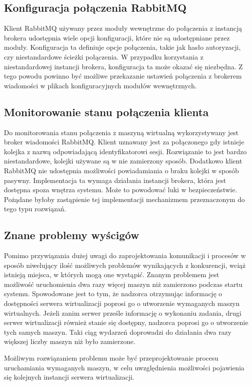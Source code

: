 \documentclass[../podsumowanie.tex]{subfiles}
\begin{document}
\subsection{Konfiguracja połączenia RabbitMQ}

Klient RabbitMQ używany przez moduły wewnętrzne do połączenia z instancją brokera udostępnia wiele opcji konfiguracji, które nie są udostępniane przez moduły. Konfiguracja ta definiuje opcje połączenia, takie jak hasło autoryzacji, czy niestandardowe ścieżki połączenia. W przypadku korzystania z niestandardowej instancji brokera, konfiguracja ta może okazać się niezbędna. Z tego powodu powinno być możliwe przekazanie ustawień połączenia z brokerem wiadomości w plikach konfiguracyjnych modułów wewnętrznych.

\subsection{Monitorowanie stanu połączenia klienta}

Do monitorowania stanu połączenia z maszyną wirtualną wykorzystywany jest broker wiadomości RabbitMQ. Klient uznawany jest za połączonego gdy istnieje kolejka z nazwą odpowiadającą identyfikatorowi sesji. Rozwiązanie to jest bardzo niestandardowe, kolejki używane są w nie zamierzony sposób. Dodatkowo klient RabbitMQ nie udostępnia możliwości powiadamiania o braku kolejki w sposób pasywny. Implementacja ta wymaga działania instancji brokera, która jest dostępna spoza wnętrza systemu. Może to powodować luki w bezpieczeństwie. Pożądane byłoby zastąpienie tej implementacji mechanizmem przeznaczonym do tego typu rozwiązań.

\subsection{Znane problemy wyścigów}

Pomimo przywiązania dużej uwagi do zaprojektowania komunikacji i procesów w sposób niwelujący ilość możliwych problemów wynikających z konkurencji, wciąż istnieją miejsca, w których mogą one wystąpić. Znanym problemem jest możliwość uruchomienia dwa razy więcej maszyn niż zamierzono podczas startu systemu. Spowodowane jest to tym, że nadzorca otrzymując informację o dostępności serwera wirtualizacji poprosi go o utworzenie wymaganych maszyn wirtualnych. Jeżeli zanim serwer prześle informację o wykonaniu zadania, drugi serwer wirtualizacji również stanie się dostępny, nadzorca poprosi go o utworzenie tych samych maszyn. Taki ciąg wydarzeń doprowadzi do działania dwa razy większej liczby maszyn niż było zamierzone.

Możliwym rozwiązaniem problemu może być przeprojektowanie procesu uruchamiania wymaganych maszyn, w celu uwzględnienia możliwości pojawienia się kolejnych instancji serwera wirtualizacji.
\end{document}
